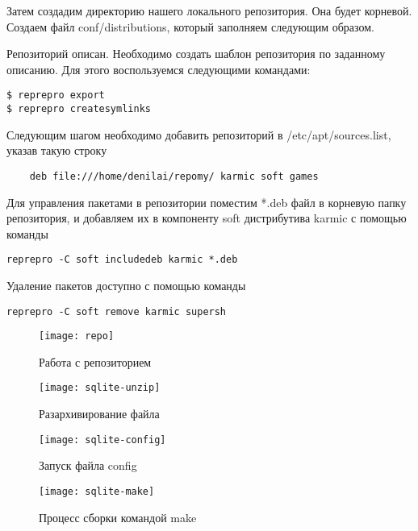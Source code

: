 \documentclass[a4paper,14pt]{extarticle}
\begin{document}
Затем создадим директорию нашего локального репозитория. Она будет корневой. Создаем файл conf/distributions, который заполняем следующим образом.

Репозиторий описан. Необходимо создать шаблон репозитория по заданному описанию. Для этого воспользуемся следующими командами:
\begin{lstlisting}
$ reprepro export
$ reprepro createsymlinks
\end{lstlisting}

Следующим шагом необходимо добавить репозиторий в /etc/apt/sources.list, указав такую строку

\begin{lstlisting}
	deb file:///home/denilai/repomy/ karmic soft games
\end{lstlisting}

Для управления пакетами в репозитории поместим *.deb файл в корневую папку репозитория, и добавляем их в компоненту soft дистрибутива karmic с помощью команды
\begin{lstlisting}
reprepro -C soft includedeb karmic *.deb
\end{lstlisting}

Удаление пакетов доступно с помощью команды
\begin{lstlisting}
reprepro -C soft remove karmic supersh
\end{lstlisting}
\begin{figure}[hpbt]
	\centering
	\texttt{[image: repo]}
	\caption{Работа с репозиторием}
	\label{img:repo}
\end{figure}
\newpage
{\centering
{}
}
\label{A}
\begin{figure}[hptb]
	\centering
	\texttt{[image: sqlite-unzip]}
	\caption{Разархивирование файла}
	\label{img:sqlite-unzip}
\end{figure}
\begin{figure}[hpbt]
	\centering
	\texttt{[image: sqlite-config]}
	\caption{Запуск файла config}
	\label{img:sql-config}
\end{figure}

\begin{figure}[htpb]
	\centering
	\texttt{[image: sqlite-make]}
	\caption{Процесс сборки командой make}
	\label{img:sqlite-make}
\end{figure}
\end{document}
